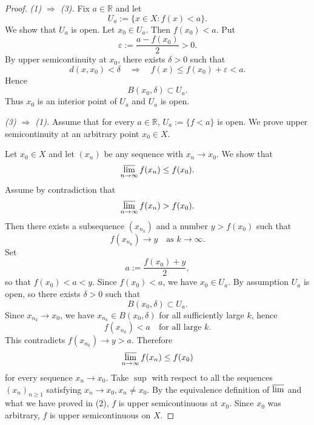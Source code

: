 \documentclass[12pt]{article}
\renewcommand{\(}{\left(}%
\renewcommand{\)}{\right)}%
\renewcommand{\[}{\left[}%
\renewcommand{\]}{\right]}%
\newtheorem{proof}{Proof.}}
\begin{document}
\begin{proof}
\emph{(1) $\Rightarrow$ (3).}
Fix $a\in\mathbb{R}$ and let
\begin{equation*}
U_a := \{x\in X : f(x) < a\}.
\end{equation*}
We show that $U_a$ is open.
Let $x_0 \in U_a$.
Then $f(x_0) < a$. Put
\begin{equation*}
\varepsilon := \frac{a - f(x_0)}{2} > 0.
\end{equation*}
By upper semicontinuity at $x_0$, there exists $\delta>0$ such that
\begin{equation*}
d(x,x_0) < \delta
\quad\Longrightarrow\quad
f(x) \leq f(x_0) + \varepsilon < a.
\end{equation*}
Hence
\begin{equation*}
B(x_0,\delta) \subset U_a.
\end{equation*}
Thus $x_0$ is an interior point of $U_a$ and $U_a$ is open.

\medskip

\emph{(3) $\Rightarrow$ (1).}
Assume that for every $a\in\mathbb{R}$, $U_a := \{f<a\}$ is open.
We prove upper semicontinuity at an arbitrary point $x_0\in X$.

Let $x_0 \in X$ and let $(x_n)$ be any sequence with $x_n \to x_0$.
We show that
\begin{equation*}
\varlimsup_{n\to\infty} f(x_n) \leq f(x_0).
\end{equation*}
Assume by contradiction that
\begin{equation*}
\varlimsup_{n\to\infty} f(x_n) > f(x_0).
\end{equation*}
Then there exists a subsequence $(x_{n_k})$ and a number
$y > f(x_0)$ such that
\begin{equation*}
f(x_{n_k}) \to y \quad\text{as } k\to\infty.
\end{equation*}
Set
\begin{equation*}
a := \frac{f(x_0)+y}{2},
\end{equation*}
so that $f(x_0) < a < y$.
Since $f(x_0) < a$, we have $x_0 \in U_a$.
By assumption $U_a$ is open, so there exists $\delta>0$ such that
\begin{equation*}
B(x_0,\delta) \subset U_a.
\end{equation*}
Since $x_{n_k} \to x_0$, we have $x_{n_k} \in B(x_0,\delta)$ for all
sufficiently large $k$, hence
\begin{equation*}
f(x_{n_k}) < a
\quad\text{for all large } k.
\end{equation*}
This contradicts $f(x_{n_k}) \to y > a$.
Therefore
\begin{equation*}
\varlimsup_{n\to\infty} f(x_n) \leq f(x_0)
\end{equation*}
for every sequence $x_n \to x_0$. Take $\sup$ with respect to all the sequences $(x_n)_{n\geq 1}$ satisfying $x_n\to x_0,x_n\neq x_0$.
By the equivalence definition of $\varlimsup$ and what we have proved in (2), $f$ is upper semicontinuous at
$x_0$.
Since $x_0$ was arbitrary, $f$ is upper semicontinuous on $X$.


\end{proof}
\end{document}
